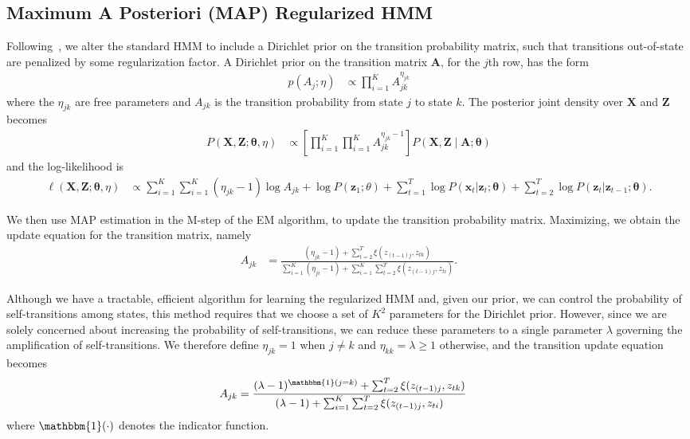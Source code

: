 \documentclass[12pt]{article}
\begin{document}
\subsection{Maximum A Posteriori (MAP) Regularized HMM}

Following~\cite{MAP1994}, we alter the standard HMM to include a Dirichlet prior on the transition probability matrix, such that transitions out-of-state are penalized by some regularization factor. A Dirichlet prior on the transition matrix $\mathbf{A}$, for the $j$th row, has the form
\begin{align*}
    p(A_j; \eta) &\propto \prod_{i=1}^{K} A_{jk}^{\eta_{jk}}
\end{align*}
where the $\eta_{jk}$ are free parameters and $A_{jk}$ is the transition probability from state $j$ to state $k$. The posterior joint density over $\mathbf{X}$ and $\mathbf{Z}$ becomes
\begin{align*}
    P(\mathbf{X}, \mathbf{Z} ; \mathbf{\theta}, \eta) 
    &\propto \left[\prod_{i=1}^{K}\prod_{i=1}^{K} A_{jk}^{\eta_{jk} - 1}\right] P(\mathbf{X}, \mathbf{Z} \mid \mathbf{A}; \mathbf{\theta}) 
\end{align*}
and the log-likelihood is
\begin{align*}
\ell(\mathbf{X}, \mathbf{Z} ; \mathbf{\theta}, \eta) 
&\propto \sum_{i=1}^{K}\sum_{i=1}^{K} (\eta_{jk} - 1)\log A_{jk} + \log P(\mathbf{z}_{1}; \theta) + \sum_{t=1}^{T}\log P(\mathbf{x}_t|\mathbf{z}_t; \mathbf{\theta}) + \sum_{t=2}^{T}\log P(\mathbf{z}_t|\mathbf{z}_{t-1}; \mathbf{\theta}).
\end{align*}

We then use MAP estimation in the M-step of the EM algorithm, to update the transition probability matrix. Maximizing, we obtain the update equation for the transition matrix, namely
\begin{align*}
    A_{jk} &= \frac{(\eta_{jk} - 1) + \sum_{t=2}^{T} \xi(z_{(t-1)j}, z_{tk})}   
    {\sum_{i=1}^{K}(\eta_{ji} - 1) + \sum_{i=1}^{K}\sum_{t=2}^{T} \xi(z_{(t-1)j}, z_{ti})}.
\end{align*}

Although we have a tractable, efficient algorithm for learning the regularized HMM and, given our prior, we can control the probability of self-transitions among states, this method requires that we choose a set of $K^2$ parameters for the Dirichlet prior. However, since we are solely concerned about increasing the probability of self-transitions, we can reduce these parameters to a single parameter $\lambda$ governing the amplification of self-transitions. We therefore define $\eta_{jk} = 1$ when $j\not=k$ and $\eta_{kk}= \lambda \geq 1$ otherwise, and the transition update equation becomes
\begin{align*}
    A_{jk} &= \frac{(\lambda - 1)^{\mathbbm{1}(j = k)} + \sum_{t=2}^{T} \xi(z_{(t-1)j}, z_{tk})}   
    {(\lambda - 1) + \sum_{i=1}^{K}\sum_{t=2}^{T} \xi(z_{(t-1)j}, z_{ti})}
\end{align*}
where $\mathbbm{1}(\cdot)$ denotes the indicator function.
\end{document}
